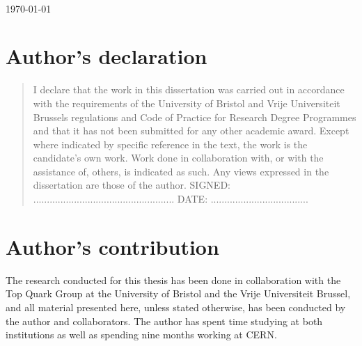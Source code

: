 \begin{titlepage}
\begin{center}
\begin{minipage}{15cm}
\end{minipage}\\
\vspace{25mm}
{\large \today\par}
\vspace{12mm}
\end{center}
\end{titlepage}







\newpage\null\thispagestyle{empty}
\newpage\chapter*{Author's declaration}
\begin{quote}
I declare that the work in this dissertation was carried out in accordance with the requirements of the University of Bristol and Vrije Universiteit Brussels regulations and Code of Practice for Research Degree Programmes and that it has not been submitted for any other academic award. Except where indicated by specific reference in the text, the work is the candidate's own work. Work done in collaboration with, or with the assistance of, others, is indicated as such. Any views expressed in the dissertation are those of the author.
\vspace{1.5cm}
\noindent
\hspace{-0.75cm}\textsc{SIGNED: .................................................... DATE: ....................................}
\end{quote}



\newpage\null\thispagestyle{empty}
\chapter*{Author's contribution}
The research conducted for this thesis has been done in collaboration with the Top Quark Group at the University of Bristol and the Vrije Universiteit Brussel, and all material presented here, unless stated otherwise, has been conducted by the author and collaborators.
The author has spent time studying at both institutions as well as spending nine months working at CERN.


